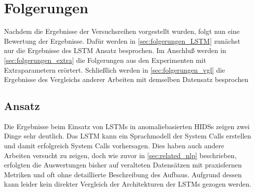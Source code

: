 \chapter{Folgerungen}\label{ch:folgerungen}
Nachdem die Ergebnisse der Versuchsreihen vorgestellt wurden, folgt nun eine Bewertung der Ergebnisse.
Dafür werden in \autoref{sec:folgerungen_LSTM} zunächst nur die Ergebnisse des \ac{LSTM} Ansatz besprochen.
Im Anschluß werden in \autoref{sec:folgerungen_extra} die Folgerungen aus den Experimenten mit Extraparametern erörtert. 
Schließlich werden in \autoref{sec:folgerungen_vgl} die Ergebnisse des Vergleichs anderer Arbeiten mit demselben Datensatz besprochen

\section{ Ansatz}\label{sec:folgerungen_LSTM}

Die Ergebnisse beim Einsatz von \acp{LSTM} in anomaliebasierten \acp{HIDS} zeigen zwei Dinge sehr deutlich.
Das \ac{LSTM} kann ein Sprachmodell der System Calls erstellen und damit erfolgreich System Calls vorhersagen.
Dies haben auch andere Arbeiten versucht zu zeigen, doch wie zuvor in \autoref{sec:related_nlp} beschrieben, erfolgten die Auswertungen bisher auf veralteten Datensätzen mit praxisfernen Metriken und oft ohne detaillierte Beschreibung des Aufbaus.
Aufgrund dessen kann leider kein direkter Vergleich der Architekturen der \acp{LSTM} gezogen werden.

